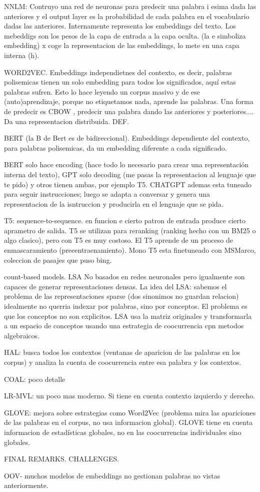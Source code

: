 NNLM: Contruyo una red de neuronas para predecir una palabra i esima dada las anteriores y el output layer es la probabilidad de cada palabra en el vocabulario dadas las anteriores. Internamente representa los embeddings del texto. Los mebeddigs son los pesos de la capa de entrada a la capa oculta. (la e simboliza embedding) x coge la representacion de las embeddings, lo mete en una capa interna (h).


WORD2VEC. Embeddings independietnes del contexto, es decir, palabras polisemicas tienen un solo embedding para todos los significados, aquí estas palabras sufren. Esto lo hace leyendo un corpus masivo y de ese (auto)aprendizaje, porque no etiquetamos nada, aprende las palabras. Una forma de predecir es CBOW , predecir una palabra dando las anteriores y posteriores.... Da una representacion distribuida. DEF. 

BERT (la B de Bert es de bidireccional). Embeddings dependiente del contexto, para palabras polisemicas, da un embedding diferente a cada significado.

BERT solo hace encoding (hace todo lo necesario para crear una representación interna del texto), GPT solo decoding (me pasas la representacion al lenguaje que te pido) y otros tienen ambas, por ejemplo T5. CHATGPT ademas esta tuneado para seguir instrucciones; luego se adapta a conversar y genera una representacion de la isntruccion y producirla en el lenguaje que se pida. 


T5: sequence-to-sequence. en funcion e cierto patron de entrada produce cierto aprametro de salida. T5 se utilizan para reranking (ranking hecho con un BM25 o algo clasico), pero con T5 es muy costoso. El T5 aprende de un proceso de enmascaramiento (preeentraenamiento). Mono T5 esta finetuneado con MSMarco, coleccion de pasajes que puso bing. 

count-based models. LSA
No basados en redes neuronales pero igualmente son capaces de generar representaciones densas. La idea del LSA: sabemos el problema de las representaciones sparse (dos sinonimos no guardan relacion) idealmente no querria indexar por palabras, sino por conceptos. El problema es que los conceptos no son explicitos. LSA usa la matriz originales y transformarla a un espacio de conceptos usando una estrategia de coocurrencia cpn metodos algebraicos. 

HAL:  busca todos los contextos (ventanas de aparicion de las palabras en los corpus) y analiza la cuenta de coocurrencia entre esa palabra y los contextos. 

COAL: poco detalle

LR-MVL: un poco mas moderno. Si tiene en cuenta contexto izquierdo y derecho. 

GLOVE: mejora sobre estrategias como Word2Vec (problema mira las apariciones de las palabras en el corpus, no usa informacion global). GLOVE tiene en cuenta informacion de estadísticas globales, no en las coocurrencias individuales sino globales.

FINAL REMARKS. CHALLENGES.

OOV- muchos modelos de embeddings no gestionan palabras no vistas anteriormente. 